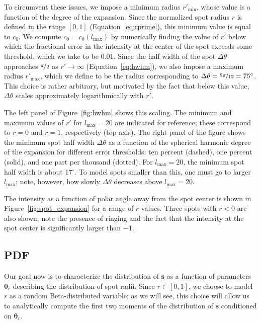 \documentclass[modern]{aastex62}
\begin{document}
To circumvent these issues, we impose a minimum radius
$r'_{\mathrm{min}}$, whose value is
a function of the degree of the expansion. Since the normalized spot radius
$r$ is defined in the range $[0, 1]$ (Equation~\ref{eq:rprime}), this
minimum value is equal to $c_0$. We compute $c_0 = c_0(l_{\mathrm{max}})$
by numerically finding the
value of $r'$ below which the fractional error in the intensity at the
center of the spot exceeds some threshold, which we take to be 0.01.
Since the half width of the spot $\Delta\theta$ approaches $\nicefrac{\pi}{2}$ as
$r' \rightarrow \infty$ (Equation~\ref{eq:hwhm}), we also impose a
maximum radius $r'_{\mathrm{max}}$, which we define to be the radius
corresponding to
$\Delta\theta = \nicefrac{5\pi}{12} = 75^\circ$. This choice is rather
arbitrary, but motivated by the fact that below this value, $\Delta\theta$
scales approximately logarithmically with $r'$.

The left panel of Figure~\ref{fig:hwhm} shows this scaling. The minimum
and maximum values of $r'$ for $l_{\mathrm{max}} = 20$ are indicated
for reference; these correspond to $r = 0$ and $r = 1$, respectively
(top axis). The right panel of the figure shows the minimum spot half width
$\Delta\theta$ as a function of the spherical harmonic degree of the
expansion for different error thresholds: ten percent (dashed), one
percent (solid), and one part per thousand (dotted).
For $l_{\mathrm{max}} = 20$, the minimum spot half width is about 17$^\circ$.
To model spots smaller than this, one must go to larger $l_{\mathrm{max}}$;
note, however, how slowly $\Delta\theta$ decreases above
$l_{\mathrm{max}} = 20$.

The intensity as a function of polar angle away from the spot center
is shown in Figure~\ref{fig:spot_expansion} for a range of $r$ values.
Three spots with $r < 0$ are also shown; note the presence of
ringing and the fact that the intensity at the spot center is significantly
larger than $-1$.

\subsection{PDF}
\label{sec:size-pdf}
%
Our goal now is to characterize the distribution of $\mathbf{s}$ as a
function of parameters $\pmb{\theta}_r$ describing the distribution of
spot radii. Since $r \in [0, 1]$, we choose to model $r$ as a random
Beta-distributed variable; as we will see, this choice will allow us to
analytically compute the first two moments of the distribution of
$\mathbf{s}$ conditioned on $\pmb{\theta}_r$.
\end{document}
